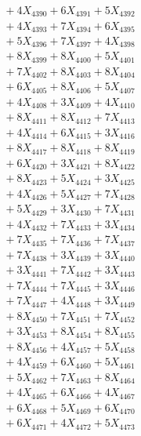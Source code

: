 \documentclass[a4paper,10pt]{article}
\begin{document}
{\begin{align}
&\;  + 4 X_{4390} + 6 X_{4391} + 5 X_{4392} \\[0.3ex]
&\;  + 4 X_{4393} + 7 X_{4394} + 6 X_{4395} \\[0.3ex]
&\;  + 5 X_{4396} + 7 X_{4397} + 4 X_{4398} \\[0.3ex]
&\;  + 8 X_{4399} + 8 X_{4400} + 5 X_{4401} \\[0.3ex]
&\;  + 7 X_{4402} + 8 X_{4403} + 8 X_{4404} \\[0.3ex]
&\;  + 6 X_{4405} + 8 X_{4406} + 5 X_{4407} \\[0.3ex]
&\;  + 4 X_{4408} + 3 X_{4409} + 4 X_{4410} \\[0.3ex]
&\;  + 8 X_{4411} + 8 X_{4412} + 7 X_{4413} \\[0.3ex]
&\;  + 4 X_{4414} + 6 X_{4415} + 3 X_{4416} \\[0.3ex]
&\;  + 8 X_{4417} + 8 X_{4418} + 8 X_{4419} \\[0.5ex]\allowbreak
&\;  + 6 X_{4420} + 3 X_{4421} + 8 X_{4422} \\[0.3ex]
&\;  + 8 X_{4423} + 5 X_{4424} + 3 X_{4425} \\[0.3ex]
&\;  + 4 X_{4426} + 5 X_{4427} + 7 X_{4428} \\[0.3ex]
&\;  + 5 X_{4429} + 3 X_{4430} + 7 X_{4431} \\[0.3ex]
&\;  + 4 X_{4432} + 7 X_{4433} + 3 X_{4434} \\[0.3ex]
&\;  + 7 X_{4435} + 7 X_{4436} + 7 X_{4437} \\[0.3ex]
&\;  + 7 X_{4438} + 3 X_{4439} + 3 X_{4440} \\[0.3ex]
&\;  + 3 X_{4441} + 7 X_{4442} + 3 X_{4443} \\[0.3ex]
&\;  + 7 X_{4444} + 7 X_{4445} + 3 X_{4446} \\[0.3ex]
&\;  + 7 X_{4447} + 4 X_{4448} + 3 X_{4449} \\[0.5ex]\allowbreak
&\;  + 8 X_{4450} + 7 X_{4451} + 7 X_{4452} \\[0.3ex]
&\;  + 3 X_{4453} + 8 X_{4454} + 8 X_{4455} \\[0.3ex]
&\;  + 8 X_{4456} + 4 X_{4457} + 5 X_{4458} \\[0.3ex]
&\;  + 4 X_{4459} + 6 X_{4460} + 5 X_{4461} \\[0.3ex]
&\;  + 5 X_{4462} + 7 X_{4463} + 8 X_{4464} \\[0.3ex]
&\;  + 4 X_{4465} + 6 X_{4466} + 4 X_{4467} \\[0.3ex]
&\;  + 6 X_{4468} + 5 X_{4469} + 6 X_{4470} \\[0.3ex]
&\;  + 6 X_{4471} + 4 X_{4472} + 5 X_{4473} \\[0.3ex]

\end{align}}
\end{document}
